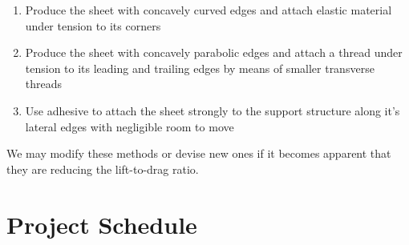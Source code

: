 \documentclass[12pt]{report} %
\begin{document}
\begin{enumerate}

\item Produce the sheet with concavely curved edges and attach elastic material under tension to its corners

\item Produce the sheet with concavely parabolic edges and attach a thread under tension to its leading and trailing
edges by means of smaller transverse threads

\item Use adhesive to attach the sheet strongly to the support structure along it's lateral edges with negligible room
to move
 
\end{enumerate}

We may modify these methods or devise new ones if it becomes apparent that they are reducing the lift-to-drag ratio.

\chapter{Project Schedule}
\end{document}
